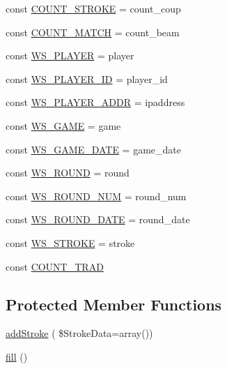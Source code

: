 \begin{DoxyCompactItemize}
\item 
const \hyperlink{class_m3_game_aa95f99c254f8dc3f5be158f781c04df3}{C\+O\+U\+N\+T\+\_\+\+S\+T\+R\+O\+KE} = \textquotesingle{}count\+\_\+coup\textquotesingle{}
\item 
const \hyperlink{class_m3_game_a2f0ddeb62f9fe56004c969a7d0e515e1}{C\+O\+U\+N\+T\+\_\+\+M\+A\+T\+CH} = \textquotesingle{}count\+\_\+beam\textquotesingle{}
\item 
const \hyperlink{class_m3_game_aa97404008a5c3e55dfab27002c45692c}{W\+S\+\_\+\+P\+L\+A\+Y\+ER} = \textquotesingle{}player\textquotesingle{}
\item 
const \hyperlink{class_m3_game_ad3cc1e8b89b076282e9142c8694c70b6}{W\+S\+\_\+\+P\+L\+A\+Y\+E\+R\+\_\+\+ID} = \textquotesingle{}player\+\_\+id\textquotesingle{}
\item 
const \hyperlink{class_m3_game_ad60528b69eb20175b249d590f1d62059}{W\+S\+\_\+\+P\+L\+A\+Y\+E\+R\+\_\+\+A\+D\+DR} = \textquotesingle{}ipaddress\textquotesingle{}
\item 
const \hyperlink{class_m3_game_a0bf1b43fb6a711542fb7960ea8ce13cd}{W\+S\+\_\+\+G\+A\+ME} = \textquotesingle{}game\textquotesingle{}
\item 
const \hyperlink{class_m3_game_a49dddb1a702d3b353b17ef4c9f34cad5}{W\+S\+\_\+\+G\+A\+M\+E\+\_\+\+D\+A\+TE} = \textquotesingle{}game\+\_\+date\textquotesingle{}
\item 
const \hyperlink{class_m3_game_a0e523cf42a879d8596432daa23257b88}{W\+S\+\_\+\+R\+O\+U\+ND} = \textquotesingle{}round\textquotesingle{}
\item 
const \hyperlink{class_m3_game_afbe61beb457d2a2fb735a84d76542b4a}{W\+S\+\_\+\+R\+O\+U\+N\+D\+\_\+\+N\+UM} = \textquotesingle{}round\+\_\+num\textquotesingle{}
\item 
const \hyperlink{class_m3_game_abee3c3be7f8ccec72ffebba614f91be2}{W\+S\+\_\+\+R\+O\+U\+N\+D\+\_\+\+D\+A\+TE} = \textquotesingle{}round\+\_\+date\textquotesingle{}
\item 
const \hyperlink{class_m3_game_a3eb5e640caded0a0df1b62d108fffe10}{W\+S\+\_\+\+S\+T\+R\+O\+KE} = \textquotesingle{}stroke\textquotesingle{}
\item 
const \hyperlink{class_m3_game_af1338c69b83867a23c5221450e309687}{C\+O\+U\+N\+T\+\_\+\+T\+R\+AD}
\end{DoxyCompactItemize}
\subsection*{Protected Member Functions}
\begin{DoxyCompactItemize}
\item 
\hyperlink{class_m3_game_a67cf9e1f6628972901cfd6667dd2d453}{add\+Stroke} ( \$Stroke\+Data=array())
\item 
\hyperlink{class_m3_game_a518b82c571e5b00f48e3898b948cfdc1}{fill} ()
\end{DoxyCompactItemize}
